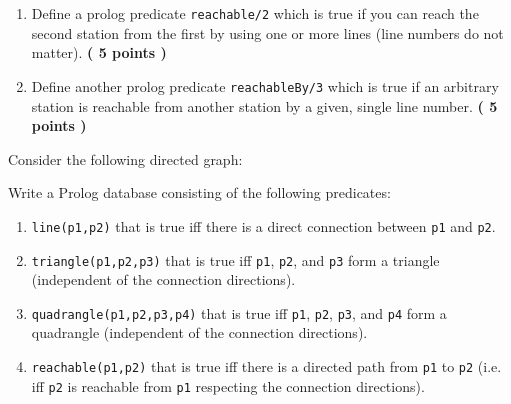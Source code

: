 \documentclass [11pt, a4wide, twoside]{article}
\begin{document}
\begin{enumerate}
\item Define a prolog predicate \texttt{reachable/2} which is true if you can reach the second station from the first by using one or more lines (line numbers do not matter). \textbf{( 5 points )} \vspace{5cm}
\item Define another prolog predicate \texttt{reachableBy/3} which is true if an arbitrary station is reachable from another station by a given, single line number. \textbf{( 5 points )}\vspace{5cm}
\end{enumerate}



\solution{\fontsize{8}{10}}


Consider the following directed graph:

\begin{figure}[h]
\end{figure}

Write a Prolog database consisting of the following predicates:

\begin{enumerate}
\renewcommand{\theenumi}{\alph{enumi}}

\item \texttt{line(p1,p2)} that is true iff there is a direct connection between \texttt{p1} and \texttt{p2}.

\item \texttt{triangle(p1,p2,p3)} that is true iff \texttt{p1}, \texttt{p2}, and \texttt{p3} form a triangle (independent of the connection directions).

\item \texttt{quadrangle(p1,p2,p3,p4)} that is true iff \texttt{p1}, \texttt{p2}, \texttt{p3}, and \texttt{p4} form a quadrangle (independent of the connection directions).

\item \texttt{reachable(p1,p2)} that is true iff there is a directed path from \texttt{p1} to \texttt{p2} (i.e. iff \texttt{p2} is reachable from \texttt{p1} respecting the connection directions).
\end{enumerate}
\end{document}
